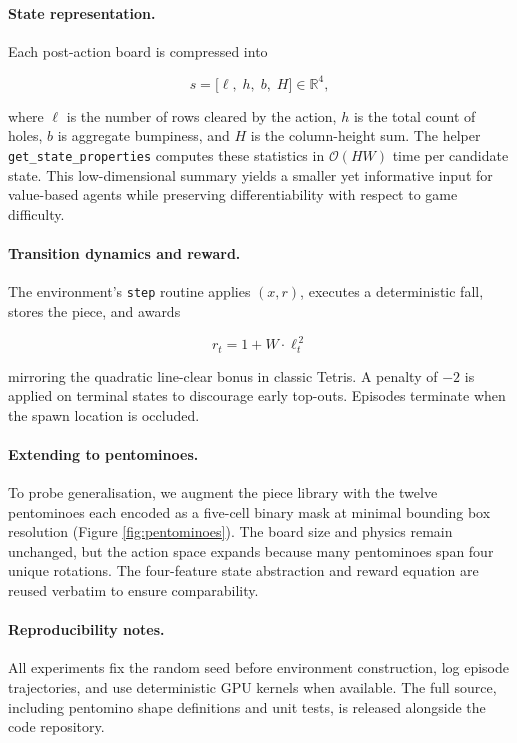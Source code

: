 \paragraph{State representation.}
Each post-action board is compressed into

\[
s=\bigl[\ell,\;h,\;b,\;H\bigr]\in\mathbb{R}^4 ,
\]

where $\ell$ is the number of rows cleared by the action, $h$ is the total count of holes, $b$ is aggregate bumpiness, and $H$ is the column-height sum.  The helper \texttt{get\_state\_properties} computes these statistics in $\mathcal{O}(HW)$ time per candidate state.  This low-dimensional summary yields a smaller yet informative input for value-based agents while preserving differentiability with respect to game difficulty.

\paragraph{Transition dynamics and reward.}
The environment's \texttt{step} routine applies $(x,r)$, executes a deterministic fall, stores the piece, and awards

\[
r_t = 1 + W\cdot \ell_t^{\,2}\]

mirroring the quadratic line-clear bonus in classic Tetris.  A penalty of $-2$ is applied on terminal states to discourage early top-outs.  Episodes terminate when the spawn location is occluded.

\paragraph{Extending to pentominoes.}
To probe generalisation, we augment the piece library with the twelve pentominoes each encoded as a five-cell binary mask at minimal bounding box resolution (Figure \ref{fig:pentominoes}). The board size and physics remain unchanged, but the action space expands because many pentominoes span four unique rotations. The four-feature state abstraction and reward equation are reused verbatim to ensure comparability.


\paragraph{Reproducibility notes.}
All experiments fix the random seed before environment construction, log episode trajectories, and use deterministic GPU kernels when available.  The full source, including pentomino shape definitions and unit tests, is released alongside the code repository.

